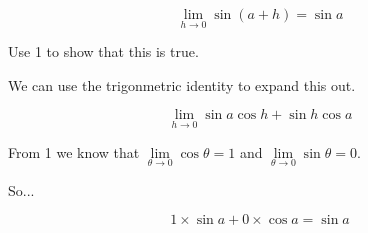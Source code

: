 \documentclass{article}
\begin{document}
\begin{enumerate}
			$$ \lim \limits _{h \to 0} \sin(a+h) = \sin a$$

			Use 1 to show that this is true.

			We can use the trigonmetric identity to expand this out.

			$$\lim \limits _{h \to 0} \sin a \cos h + \sin h \cos a$$

			From 1 we know that $\lim \limits _{\theta \to 0} \cos \theta = 1$
			and $\lim \limits _{\theta \to 0} \sin \theta = 0$.

			So...

			$$1 \times \sin a + 0 \times \cos a = \sin a$$
		
	\end{enumerate}
\end{document}
